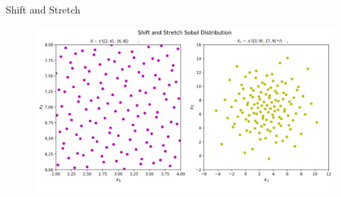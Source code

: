 \documentclass[11pt]{beamer}
\begin{document}
\begin{frame}{Shift and Stretch}
    
    \begin{figure}[ht!]
        \centering
        \includegraphics[width=1\textwidth]
            {Figs/shift_stretch_tm.png}
        \label{fig:ss_tm}
    \end{figure}
\end{frame}

\end{document}
